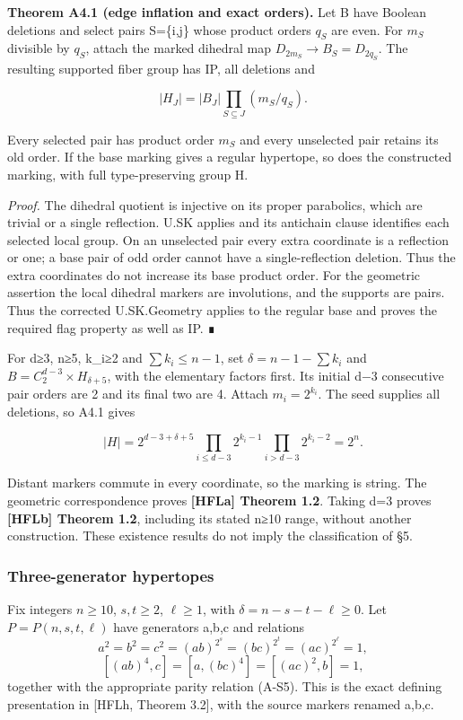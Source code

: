 \documentclass[
  11pt,
  a4paper,
]{article}
\begin{document}
\textbf{Theorem A4.1 (edge inflation and exact orders).} Let B have
Boolean deletions and select pairs S=\{i,j\} whose product orders
\(q_S\) are even. For \(m_S\) divisible by \(q_S\), attach the marked
dihedral map \(D_{2m_S}\to B_S=D_{2q_S}\). The resulting supported fiber
group has IP, all deletions and

\[
 |H_J|=|B_J|\prod_{S\subseteq J}(m_S/q_S).
\]

Every selected pair has product order \(m_S\) and every unselected pair
retains its old order. If the base marking gives a regular hypertope, so
does the constructed marking, with full type-preserving group H.

\emph{Proof.} The dihedral quotient is injective on its proper
parabolics, which are trivial or a single reflection. U.SK applies and
its antichain clause identifies each selected local group. On an
unselected pair every extra coordinate is a reflection or one; a base
pair of odd order cannot have a single-reflection deletion. Thus the
extra coordinates do not increase its base product order. For the
geometric assertion the local dihedral markers are involutions, and the
supports are pairs. Thus the corrected U.SK.Geometry applies to the
regular base and proves the required flag property as well as IP. ∎

For d≥3, n≥5, k\_i≥2 and \(\sum k_i\le n-1\), set
\(\delta=n-1-\sum k_i\) and \(B=C_2^{d-3}\times H_{\delta+5}\), with the
elementary factors first. Its initial d−3 consecutive pair orders are 2
and its final two are 4. Attach \(m_i=2^{k_i}\). The seed supplies all
deletions, so A4.1 gives

\[
 |H|=2^{d-3+\delta+5}
       \prod_{i\le d-3}2^{k_i-1}
       \prod_{i>d-3}2^{k_i-2}=2^n.
\]

Distant markers commute in every coordinate, so the marking is string.
The geometric correspondence proves \textbf{{[}HFLa{]} Theorem 1.2}.
Taking d=3 proves \textbf{{[}HFLb{]} Theorem 1.2}, including its stated
n≥10 range, without another construction. These existence results do not
imply the classification of §5.

\subsubsection{Three-generator
hypertopes}\label{three-generator-hypertopes}

Fix integers \(n\ge10\), \(s,t\ge2\), \(\ell\ge1\), with
\(\delta=n-s-t-\ell\ge0\). Let \(P=P(n,s,t,\ell)\) have generators a,b,c
and relations \[
 a^2=b^2=c^2=(ab)^{2^s}=(bc)^{2^t}=(ac)^{2^\ell}=1,
\] \[
 [(ab)^4,c]=[a,(bc)^4]=[(ac)^2,b]=1,
 \tag{A-H1}
\] together with the appropriate parity relation (A-S5). This is the
exact defining presentation in {[}HFLh, Theorem 3.2{]}, with the source
markers renamed a,b,c.
\end{document}
